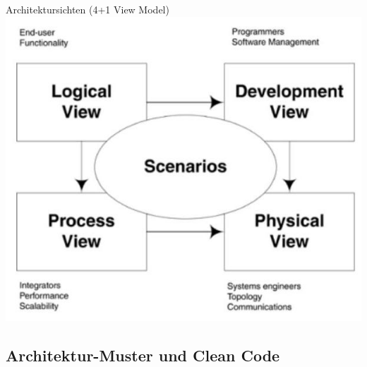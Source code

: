 \begin{concept}{Architektursichten (4+1 View Model)}
\includegraphics[width=0.8\linewidth]{images/2024_12_29_0d1d7b5551ea1b4b41bdg-09}
\end{concept}

\subsection{Architektur-Muster und Clean Code}


